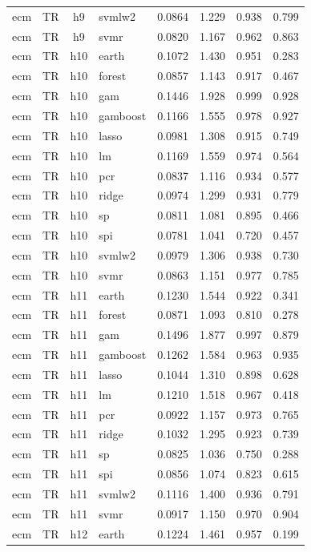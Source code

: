 \begin{ThreePartTable}
\begin{longtable}[t]{llclcccc}
ecm & TR & h9 & svmlw2 & 0.0864 & 1.229 & 0.938 & 0.799\\
ecm & TR & h9 & svmr & 0.0820 & 1.167 & 0.962 & 0.863\\
\addlinespace
ecm & TR & h10 & earth & 0.1072 & 1.430 & 0.951 & 0.283\\
ecm & TR & h10 & forest & 0.0857 & 1.143 & 0.917 & 0.467\\
ecm & TR & h10 & gam & 0.1446 & 1.928 & 0.999 & 0.928\\
ecm & TR & h10 & gamboost & 0.1166 & 1.555 & 0.978 & 0.927\\
ecm & TR & h10 & lasso & 0.0981 & 1.308 & 0.915 & 0.749\\
ecm & TR & h10 & lm & 0.1169 & 1.559 & 0.974 & 0.564\\
ecm & TR & h10 & pcr & 0.0837 & 1.116 & 0.934 & 0.577\\
ecm & TR & h10 & ridge & 0.0974 & 1.299 & 0.931 & 0.779\\
ecm & TR & h10 & sp & 0.0811 & 1.081 & 0.895 & 0.466\\
ecm & TR & h10 & spi & 0.0781 & 1.041 & 0.720 & 0.457\\
ecm & TR & h10 & svmlw2 & 0.0979 & 1.306 & 0.938 & 0.730\\
ecm & TR & h10 & svmr & 0.0863 & 1.151 & 0.977 & 0.785\\
\addlinespace
ecm & TR & h11 & earth & 0.1230 & 1.544 & 0.922 & 0.341\\
ecm & TR & h11 & forest & 0.0871 & 1.093 & 0.810 & 0.278\\
ecm & TR & h11 & gam & 0.1496 & 1.877 & 0.997 & 0.879\\
ecm & TR & h11 & gamboost & 0.1262 & 1.584 & 0.963 & 0.935\\
ecm & TR & h11 & lasso & 0.1044 & 1.310 & 0.898 & 0.628\\
ecm & TR & h11 & lm & 0.1210 & 1.518 & 0.967 & 0.418\\
ecm & TR & h11 & pcr & 0.0922 & 1.157 & 0.973 & 0.765\\
ecm & TR & h11 & ridge & 0.1032 & 1.295 & 0.923 & 0.739\\
ecm & TR & h11 & sp & 0.0825 & 1.036 & 0.750 & 0.288\\
ecm & TR & h11 & spi & 0.0856 & 1.074 & 0.823 & 0.615\\
ecm & TR & h11 & svmlw2 & 0.1116 & 1.400 & 0.936 & 0.791\\
ecm & TR & h11 & svmr & 0.0917 & 1.150 & 0.970 & 0.904\\
\addlinespace
ecm & TR & h12 & earth & 0.1224 & 1.461 & 0.957 & 0.199\\

\end{longtable}
\end{ThreePartTable}
